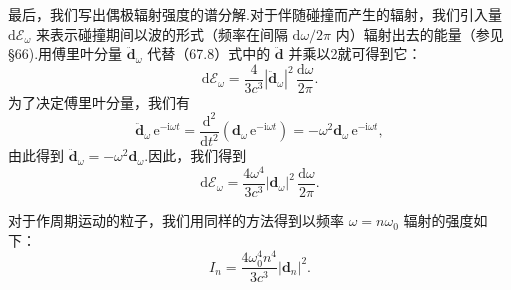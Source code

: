 最后，我们写出偶极辐射强度的谱分解.对于伴随碰撞而产生的辐射，我们引入量 $\mathrm{d}\mathcal{E}_\omega$ 来表示碰撞期间以波的形式（频率在间隔 $\mathrm{d}\omega/2\pi$ 内）辐射出去的能量（参见§66).用傅里叶分量 $\ddot{\boldsymbol{d}}_\omega$ 代替（67.8）式中的 $\ddot{\boldsymbol{d}}$ 并乘以2就可得到它：
\begin{equation*}
  \mathrm{d}\mathcal{E}_\omega=\frac{4}{3c^3}|\ddot{\boldsymbol{d}}_\omega|^2\,\frac{\mathrm{d}\omega}{2\pi}.
\end{equation*}
为了决定傅里叶分量，我们有
\begin{equation*}
  \ddot{\boldsymbol{d}}_\omega\,\mathrm{e}^{-\mathrm{i}\omega t}=\frac{\mathrm{d}^2}{\mathrm{d}t^2}(\boldsymbol{d}_\omega\,\mathrm{e}^{-\mathrm{i}\omega t})=-\omega^2\boldsymbol{d}_\omega\,\mathrm{e}^{-\mathrm{i}\omega t},
\end{equation*}
由此得到 $\ddot{\boldsymbol{d}}_\omega=-\omega^2\boldsymbol{d}_\omega$.因此，我们得到
\begin{equation}
  \mathrm{d}\mathcal{E}_\omega=\frac{4\omega^4}{3c^3}|\boldsymbol{d}_\omega|^2\,\frac{\mathrm{d}\omega}{2\pi}.
\end{equation}

对于作周期运动的粒子，我们用同样的方法得到以频率 $\omega=n\omega_0$ 辐射的强度如下：
\begin{equation}
  I_n=\frac{4\omega_0^4n^4}{3c^3}|\boldsymbol{d}_n|^2.
\end{equation}


